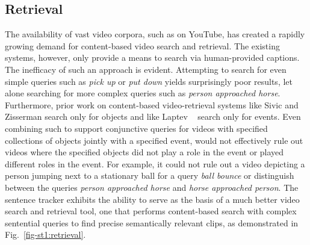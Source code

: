 \subsection{Retrieval}
\label{subsec:retrieval}
%
The availability of vast video corpora, such as on YouTube, has created a
rapidly growing demand for content-based video search and retrieval.
%
The existing systems, however, only provide a means to search via human-provided
captions.
%
The inefficacy of such an approach is evident.
%
Attempting to search for even simple queries such as \emph{pick up} or
\emph{put down} yields surprisingly poor results, let alone searching for more
complex queries such as \emph{person approached horse}.
%
Furthermore, prior work on content-based video-retrieval systems like Sivic and
Zisserman \cite{Sivic2003} search only for objects and like Laptev \etal\
\cite{laptev:08} search only for events.
%
Even combining such to support conjunctive queries for videos with specified
collections of objects jointly with a specified event, would not effectively
rule out videos where the specified objects did not play a role in the event or
played different roles in the event.
%
For example, it could not rule out a video depicting a person jumping next to a
stationary ball for a query \emph{ball bounce} or distinguish between the
queries \emph{person approached horse} and \emph{horse approached person}.
%
The sentence tracker exhibits the ability to serve as the basis of a much
better video search and retrieval tool, one that performs content-based search
with complex sentential queries to find precise semantically relevant clips,
as demonstrated in Fig.~\ref{fig-st1:retrieval}.



